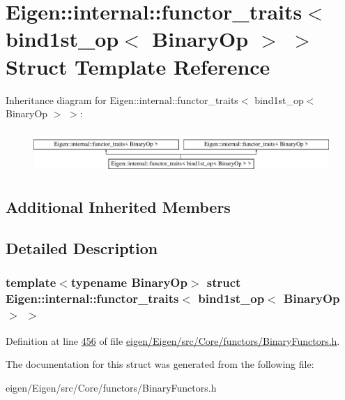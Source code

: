 \hypertarget{struct_eigen_1_1internal_1_1functor__traits_3_01bind1st__op_3_01_binary_op_01_4_01_4}{}\section{Eigen\+:\+:internal\+:\+:functor\+\_\+traits$<$ bind1st\+\_\+op$<$ Binary\+Op $>$ $>$ Struct Template Reference}
\label{struct_eigen_1_1internal_1_1functor__traits_3_01bind1st__op_3_01_binary_op_01_4_01_4}
Inheritance diagram for Eigen\+:\+:internal\+:\+:functor\+\_\+traits$<$ bind1st\+\_\+op$<$ Binary\+Op $>$ $>$\+:\begin{figure}[H]
\begin{center}
\leavevmode
\includegraphics[height=1.632653cm]{struct_eigen_1_1internal_1_1functor__traits_3_01bind1st__op_3_01_binary_op_01_4_01_4}
\end{center}
\end{figure}
\subsection*{Additional Inherited Members}


\subsection{Detailed Description}
\subsubsection*{template$<$typename Binary\+Op$>$\newline
struct Eigen\+::internal\+::functor\+\_\+traits$<$ bind1st\+\_\+op$<$ Binary\+Op $>$ $>$}



Definition at line \hyperlink{eigen_2_eigen_2src_2_core_2functors_2_binary_functors_8h_source_l00456}{456} of file \hyperlink{eigen_2_eigen_2src_2_core_2functors_2_binary_functors_8h_source}{eigen/\+Eigen/src/\+Core/functors/\+Binary\+Functors.\+h}.



The documentation for this struct was generated from the following file\+:\begin{DoxyCompactItemize}
\item 
eigen/\+Eigen/src/\+Core/functors/\+Binary\+Functors.\+h\end{DoxyCompactItemize}
